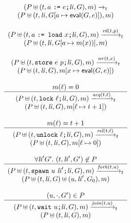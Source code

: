 \documentclass[preprint, 9pt]{sigplanconf}
\newcommand{\assign}[2]{#1\ \texttt{:=}\ #2}
\newcommand{\load}[2]{#1\ \texttt{:= load}\ #2}
\newcommand{\store}[2]{\texttt{store}\ #2\ #1}
\newcommand{\lock}[1]{\texttt{lock}\ #1}
\newcommand{\unlock}[1]{\texttt{unlock}\ #1}
\newcommand{\spawn}[2]{\texttt{spawn}\ #1\ #2}
\newcommand{\wait}[1]{\texttt{wait}\ #1}
\newcommand{\cfg}[2]{\ensuremath{(#1, #2)}}
\newcommand{\anarrow}[2]{\ensuremath{\xrightarrow{#2}_{#1}}}
\begin{document}
\begin{figure}[tb]
\[
\begin{array}{c}
 \cfg{P \uplus (t, \assign{a}{e}\texttt{;} \mathit{li}, G)}{m}  
\anarrow{t}{} \\
\cfg{P \uplus (t, \mathit{li}, G[a \mapsto \mathsf{eval}(G, e)])}{m}
\\\\

\cfg{P \uplus (t, \load{a}{x}\texttt{;} \mathit{li}, G)}{m}  
\anarrow{t}{\mathit{rd}(t, p)} \\
\cfg{P \uplus (t, \mathit{li}, G[a \mapsto m(x))]}{m}
\\\\

\cfg{P \uplus (t, \store{p}{e}\texttt{;} \mathit{li}, G)}{m} 
\anarrow{t}{\mathit{wr}(t, x)} \\
\cfg{P \uplus (t, \mathit{li}, G)}{m[x \mapsto \mathsf{eval}(G, e)]}
\\\\

\multicolumn{1}{c}{m(\ell) = 0}
\\ \hline
\cfg{P \uplus (t, \lock{\ell}\texttt{;} \mathit{li}, G)}{m}
 \anarrow{t}{\mathit{acq}(t, \ell)} \\
\cfg{P \uplus (t, \mathit{li}, G)}{m[\ell \mapsto t + 1]}
\\\\

\multicolumn{1}{c}{m(\ell) = t + 1} 
\\ \hline
\cfg{P \uplus (t, \unlock{\ell}\texttt{;} \mathit{li}, G)}{m}
\anarrow{t}{\mathit{rel}(t, \ell)} \\
\cfg{P \uplus (t, \mathit{li}, G)}{m[\ell \mapsto 0]}
\\\\

\multicolumn{1}{c}{\forall \mathit{li}' G'.\ (t, \mathit{li}', G') \not\in P}
\\ \hline \rule{0pt}{2.5ex}
\cfg{P \uplus (t, \spawn{u}{\mathit{li}'}\texttt{;} \mathit{li}, G)}{m}
\anarrow{t}{\mathit{fork}(t, u)} \\
\cfg{P \uplus (t, \mathit{li}, G) \uplus (u, \mathit{li}', G_0)}{m}
\\\\

\multicolumn{1}{c}{(u, \cdot, G') \in P}
\\ \hline \rule{0pt}{2.5ex}
\cfg{P \uplus (t, \wait{u}\texttt{;} \mathit{li}, G)}{m}
 \anarrow{t}{\mathit{join}(t, u)} \\
\cfg{P \uplus (t, \mathit{li}, G)}{m}
\\\\


\end{array}\]
\end{figure}
\end{document}
